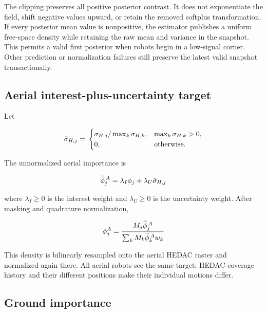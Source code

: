 \documentclass[11pt]{article}
\begin{document}
The clipping preserves all positive posterior contrast. It does not
exponentiate the field, shift negative values upward, or retain the removed
softplus transformation. If every posterior mean value is nonpositive, the
estimator publishes a uniform free-space density while retaining the raw mean
and variance in the snapshot. This permits a valid first posterior when robots
begin in a low-signal corner. Other prediction or normalization failures still
preserve the latest valid snapshot transactionally.


\subsection{Aerial interest-plus-uncertainty target}


Let


\begin{equation}
\bar\sigma_{H,j} \\
= \\
\begin{cases}
\sigma_{H,j}/\max_k\sigma_{H,k}, &
\max_k\sigma_{H,k}>0,\\
0, & \text{otherwise}. \\
\end{cases}
\end{equation}


The unnormalized aerial importance is


\begin{equation}
\widetilde\phi^{\,A}_j \\
= \\
\lambda_I\phi_j+\lambda_U\bar\sigma_{H,j}
\end{equation}


where $\lambda_I\ge 0$ is the interest weight and $\lambda_U\ge 0$ is the uncertainty weight. After masking and quadrature normalization,


\begin{equation}
\phi^A_j \\
= \\
\frac{M_j\widetilde\phi^{\,A}_j}{\sum_kM_k\widetilde\phi^{\,A}_kw_k}
\end{equation}


This density is bilinearly resampled onto the aerial HEDAC raster and normalized again there. All aerial robots see the same target; HEDAC coverage history and their different positions make their individual motions differ.


\subsection{Ground importance}
\end{document}
